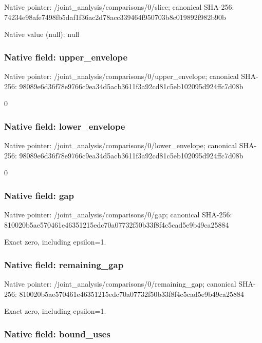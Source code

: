 \documentclass[10pt,a4paper]{article}
\begin{document}
Native pointer: /joint\_analysis/comparisons/0/slice; canonical SHA-256: 74234e98afe7498fb5daf1f3\allowbreak{}6ac2d78acc339464f950703b\allowbreak{}8c019892f982b90b



Native value (null): null



\subsubsection{Native field: upper\_envelope}


Native pointer: /joint\_analysis/comparis\allowbreak{}ons/0/upper\_envelope; canonical SHA-256: 98089e6d36f78e9766c9ea34\allowbreak{}d5acb3611f3a92cd81c5eb10\allowbreak{}2095d924ffc7d08b


0


\subsubsection{Native field: lower\_envelope}


Native pointer: /joint\_analysis/comparis\allowbreak{}ons/0/lower\_envelope; canonical SHA-256: 98089e6d36f78e9766c9ea34\allowbreak{}d5acb3611f3a92cd81c5eb10\allowbreak{}2095d924ffc7d08b


0


\subsubsection{Native field: gap}


Native pointer: /joint\_analysis/comparisons/0/gap; canonical SHA-256: 810020b5ae570461e4635121\allowbreak{}5edc70a07732f50b33f8f4c5\allowbreak{}cad5e9b49ca25884


Exact zero, including epsilon=1.


\subsubsection{Native field: remaining\_gap}


Native pointer: /joint\_analysis/comparis\allowbreak{}ons/0/remaining\_gap; canonical SHA-256: 810020b5ae570461e4635121\allowbreak{}5edc70a07732f50b33f8f4c5\allowbreak{}cad5e9b49ca25884


Exact zero, including epsilon=1.


\subsubsection{Native field: bound\_uses}
\end{document}
